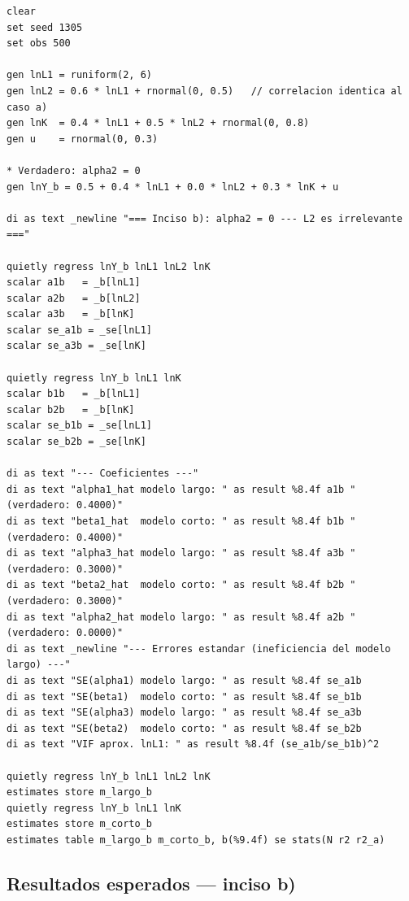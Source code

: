 \documentclass[12pt, letterpaper]{article}
\begin{document}
\begin{lstlisting}[caption={Verificación de insesgadez cuando $L_2$ es irrelevante ($\alpha_2 = 0$)}]
clear
set seed 1305
set obs 500

gen lnL1 = runiform(2, 6)
gen lnL2 = 0.6 * lnL1 + rnormal(0, 0.5)   // correlacion identica al caso a)
gen lnK  = 0.4 * lnL1 + 0.5 * lnL2 + rnormal(0, 0.8)
gen u    = rnormal(0, 0.3)

* Verdadero: alpha2 = 0
gen lnY_b = 0.5 + 0.4 * lnL1 + 0.0 * lnL2 + 0.3 * lnK + u

di as text _newline "=== Inciso b): alpha2 = 0 --- L2 es irrelevante ==="

quietly regress lnY_b lnL1 lnL2 lnK
scalar a1b   = _b[lnL1]
scalar a2b   = _b[lnL2]
scalar a3b   = _b[lnK]
scalar se_a1b = _se[lnL1]
scalar se_a3b = _se[lnK]

quietly regress lnY_b lnL1 lnK
scalar b1b   = _b[lnL1]
scalar b2b   = _b[lnK]
scalar se_b1b = _se[lnL1]
scalar se_b2b = _se[lnK]

di as text "--- Coeficientes ---"
di as text "alpha1_hat modelo largo: " as result %8.4f a1b "  (verdadero: 0.4000)"
di as text "beta1_hat  modelo corto: " as result %8.4f b1b "  (verdadero: 0.4000)"
di as text "alpha3_hat modelo largo: " as result %8.4f a3b "  (verdadero: 0.3000)"
di as text "beta2_hat  modelo corto: " as result %8.4f b2b "  (verdadero: 0.3000)"
di as text "alpha2_hat modelo largo: " as result %8.4f a2b "  (verdadero: 0.0000)"
di as text _newline "--- Errores estandar (ineficiencia del modelo largo) ---"
di as text "SE(alpha1) modelo largo: " as result %8.4f se_a1b
di as text "SE(beta1)  modelo corto: " as result %8.4f se_b1b
di as text "SE(alpha3) modelo largo: " as result %8.4f se_a3b
di as text "SE(beta2)  modelo corto: " as result %8.4f se_b2b
di as text "VIF aprox. lnL1: " as result %8.4f (se_a1b/se_b1b)^2

quietly regress lnY_b lnL1 lnL2 lnK
estimates store m_largo_b
quietly regress lnY_b lnL1 lnK
estimates store m_corto_b
estimates table m_largo_b m_corto_b, b(%9.4f) se stats(N r2 r2_a)
\end{lstlisting}

\subsection{Resultados esperados --- inciso b)}
\end{document}
